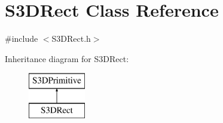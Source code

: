 \hypertarget{class_s3_d_rect}{
\section{S3DRect Class Reference}
\label{class_s3_d_rect}
}


{\ttfamily \#include $<$S3DRect.h$>$}

Inheritance diagram for S3DRect:\begin{figure}[H]
\begin{center}
\leavevmode
\includegraphics[height=2cm]{class_s3_d_rect}
\end{center}
\end{figure}
